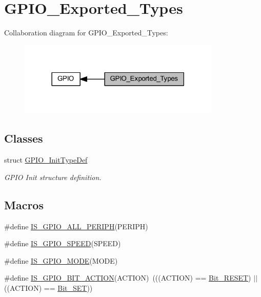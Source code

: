 \hypertarget{group___g_p_i_o___exported___types}{}\section{G\+P\+I\+O\+\_\+\+Exported\+\_\+\+Types}
\label{group___g_p_i_o___exported___types}
Collaboration diagram for G\+P\+I\+O\+\_\+\+Exported\+\_\+\+Types\+:
\nopagebreak
\begin{figure}[H]
\begin{center}
\leavevmode
\includegraphics[width=273pt]{group___g_p_i_o___exported___types}
\end{center}
\end{figure}
\subsection*{Classes}
\begin{DoxyCompactItemize}
\item 
struct \hyperlink{struct_g_p_i_o___init_type_def}{G\+P\+I\+O\+\_\+\+Init\+Type\+Def}
\begin{DoxyCompactList}\small\item\em G\+P\+IO Init structure definition. \end{DoxyCompactList}\end{DoxyCompactItemize}
\subsection*{Macros}
\begin{DoxyCompactItemize}
\item 
\#define \hyperlink{group___g_p_i_o___exported___types_ga68b2a1f0b05c13978217db5439c7f790}{I\+S\+\_\+\+G\+P\+I\+O\+\_\+\+A\+L\+L\+\_\+\+P\+E\+R\+I\+PH}(P\+E\+R\+I\+PH)
\item 
\#define \hyperlink{group___g_p_i_o___exported___types_ga888e1f951df2fe9dbf827528051a3a56}{I\+S\+\_\+\+G\+P\+I\+O\+\_\+\+S\+P\+E\+ED}(S\+P\+E\+ED)
\item 
\#define \hyperlink{group___g_p_i_o___exported___types_gacc5fde3eef57ec3c558c11d0011d900c}{I\+S\+\_\+\+G\+P\+I\+O\+\_\+\+M\+O\+DE}(M\+O\+DE)
\item 
\#define \hyperlink{group___g_p_i_o___exported___types_ga6b882caa8ed9857c5c7267959a7818c5}{I\+S\+\_\+\+G\+P\+I\+O\+\_\+\+B\+I\+T\+\_\+\+A\+C\+T\+I\+ON}(A\+C\+T\+I\+ON)~(((A\+C\+T\+I\+ON) == \hyperlink{group___g_p_i_o___exported___types_gga176130b21c0e719121470a6042d4cf19ae2c026f2b44a949f82a65f3385edef09}{Bit\+\_\+\+R\+E\+S\+ET}) $\vert$$\vert$ ((A\+C\+T\+I\+ON) == \hyperlink{group___g_p_i_o___exported___types_gga176130b21c0e719121470a6042d4cf19a3c477841a6ceec13fe47ef322432b992}{Bit\+\_\+\+S\+ET}))
\end{DoxyCompactItemize}
